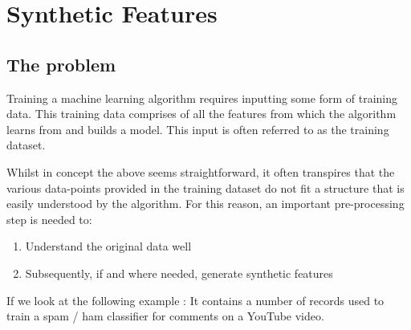\chapter{Synthetic Features}
\label{ch:synthetic features}

\section{The problem}
Training a machine learning algorithm requires inputting some form of training data. This training data comprises of all the features from which the algorithm learns from and builds a model. This input is often referred to as the training dataset.

Whilst in concept the above seems straightforward, it often transpires that the various data-points provided in the training dataset do not fit a structure that is easily understood by the algorithm. For this reason, an important pre-processing step is needed to:

\begin{enumerate}
    \item Understand the original data well
    \item Subsequently, if and where needed, generate synthetic features
\end{enumerate}

If we look at the following example \citep{AlbertoTubeSpam}: It contains a number of records used to train a spam / ham classifier for comments on a YouTube video.

\begin{table}[ht]
    \centering
    \selectfont
    \caption{Sample of four rows from the Psy dataset from the YouTube comment training dataset.}
    \label{tab:sf_origdatasample}
\end{table}
\vspace{2mm}

